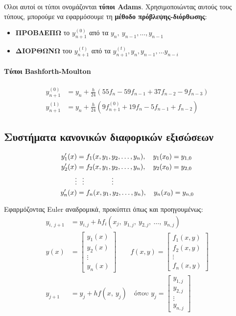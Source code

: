 \documentclass[11pt,a4paper,notitlepage,fleqn]{article}
\begin{document}
Όλοι αυτοί οι τύποι ονομάζονται \textbf{τύποι Adams}. Χρησιμοποιώντας
αυτούς τους τύπους, μπορούμε να εφαρμόσουμε τη \textbf{μέθοδο
πρόβλεψης-διόρθωσης}:
\begin{itemize}
	\item \textbf{ΠΡΟΒΛΕΠΩ}
	το \( y_{n+1}^{(0)} \) από τα \( y_n,\ y_{n-1},\dots,
	y_{n-1} \)
	\item \textbf{ΔΙΟΡΘΩΝΩ}
	του \( y_{n+1}^{(t)} \) από τα \( y_{n+1}^{(t)}, y_n,y_{n-1},\dots
	y_{n-i} \)
\end{itemize}

\paragraph{Τύποι Bashforth-Moulton}
\begin{align*}
	y_{n+1}^{(0)} &= y_n+\frac{h}{24} \left(
	55f_n-59f_{n-1}+37f_{n-2}-9f_{n-3}
	\right) \\
	y_{n+1}^{(1)} &= y_n + \frac{h}{24} \left(
	9f_{n+1}^{(0)}+19f_n-5f_{n-1}+f_{n-2}
	\right)
\end{align*}

\subsection{Συστήματα κανονικών διαφορικών εξισώσεων}
\begin{align*}
	y_1'(x)  &= f_1(x,y_1,y_2,\dots,y_n),\quad y_1(x_0) = y_{1,0} \\
	y_2'(x)  &= f_2(x,y_1,y_2,\dots,y_n),\quad y_2(x_0) = y_{2,0} \\
	\vdots &\hphantom{= } \vdots \qquad \qquad \vdots \\
	y_n'(x) &= f_n(x,y_1,y_2,\dots,y_n),\quad y_n(x_0)=y_{n,0}
\end{align*}

Εφαρμόζοντας Euler αναδρομικά, προκύπτει όπως και προηγουμένως:
\begin{align*}
	y_{i,\ j+1} &= y_{i,j}+hf_i(x_j,\ y_{1,j},\ y_{2,j},\ \dots,\ 
	y_{n,j}) \\
	y(x) &= \left[\begin{matrix}
	y_1(x) \\ y_2(x) \\ \vdots \\ y_n(x)
	\end{matrix}\right] \qquad
	f(x,y) = \left[\begin{matrix}
	f_1(x,y) \\ f_2(x,y) \\ \vdots \\ f_n(x,y)
	\end{matrix}\right] \\
	y_{j+1} &= y_j + hf(x,\ y_j)
	\quad \text{όπου } y_j = \left[\begin{matrix}
	y_{1,j} \\ y_{2,j} \\ \vdots \\ y_{n,j}
	\end{matrix}\right]
\end{align*}
\end{document}
